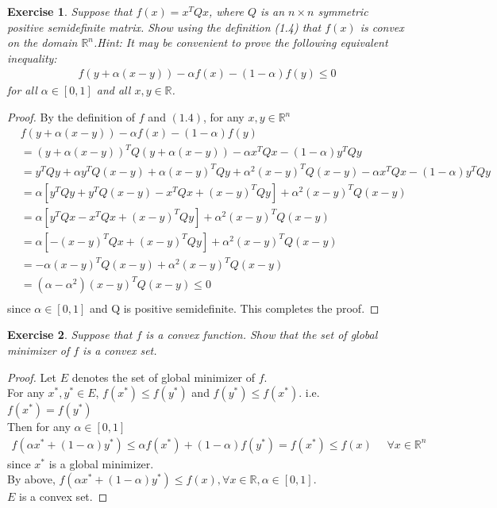 \documentclass[11pt,a4paper]{article}
\renewcommand{\(}{\left(}
\renewcommand{\)}{\right)}
\newtheorem{exercise}{Exercise}
\begin{document}
  \setcounter{exercise}{6}
  
  \begin{exercise}
  	Suppose that $f(x) = x^{T}Qx$, where $Q$ is an $n\times n$ symmetric positive semidefinite matrix. Show using the definition (1.4) that $f(x)$ is convex on the domain $\mathbb{R}^{n}$.Hint: It may be convenient to prove the following equivalent inequality:
\begin{align*}
f(y+\alpha(x-y))-\alpha f(x) - (1-\alpha)f(y)\leq 0
\end{align*}
for all $\alpha \in [0, 1]$ and all $x, y \in  \mathbb{R} $.
  \end{exercise}  
  \begin{proof}
By the definition of $f$ and $(1.4)$, for any $x, y \in \mathbb{R}^{n}$
\begin{align*}
&f(y + \alpha(x-y))-\alpha f(x)-(1-\alpha )f(y)\\
&=(y+\alpha(x-y))^{T}Q(y+\alpha(x-y))-\alpha x^{T}Qx-(1-\alpha)y^{T}Qy\\
&=y^{T}Qy+\alpha y^{T}Q(x-y)+\alpha(x-y)^{T}Qy+\alpha^{2}(x-y)^{T}Q(x-y)-\alpha x^{T}Qx-(1-\alpha)y^{T}Qy\\
&=\alpha[y^{T}Qy+y^{T}Q(x-y)-x^{T}Qx+(x-y)^{T}Qy]+\alpha^{2}(x-y)^{T}Q(x-y)\\
&=\alpha[y^{T}Qx-x^{T}Qx+(x-y)^{T}Qy]+\alpha^{2}(x-y)^{T}Q(x-y)\\
&=\alpha[-(x-y)^{T}Qx+(x-y)^{T}Qy]+\alpha^{2}(x-y)^{T}Q(x-y)\\
&=-\alpha(x-y)^{T}Q(x-y)+\alpha^{2}(x-y)^{T}Q(x-y)\\
&=(\alpha-\alpha^{2})(x-y)^{T}Q(x-y)\leq0\\
\end{align*}
since $\alpha \in [0, 1]$ and Q is positive semidefinite. This completes the proof.  	
  \end{proof}
  
  \begin{exercise}
  Suppose that $f$ is a convex function. Show that the set of global minimizer of $f$ is a convex set.	
  \end{exercise}  
  \begin{proof}
  Let $E$ denotes the set of global minimizer of $f$.\\
For any $x^{*}, y^{*}\in E$, $ f(x^{*})\leq f(y^{*})$ and $ f(y^{*})\leq f(x^{*})$. i.e. $f(x^{*})=f(y^{*})$\\
Then for any $\alpha \in [0,1]$
\begin{align*}
f(\alpha x^{*}+(1-\alpha)y^{*})\leq\alpha f(x^{*})+(1-\alpha)f(y^{*}) = f(x^{*})\leq f(x)~~~~~~\forall x \in \mathbb{R}^{n}
\end{align*}
since $x^{*}$ is a global minimizer.\\
By above, $f(\alpha x^{*}+(1-\alpha)y^{*})\leq f(x),\forall x \in \mathbb{R}, \alpha \in [0,1].$\\
$E$ is a convex set.	
  \end{proof}
  
\end{document}
